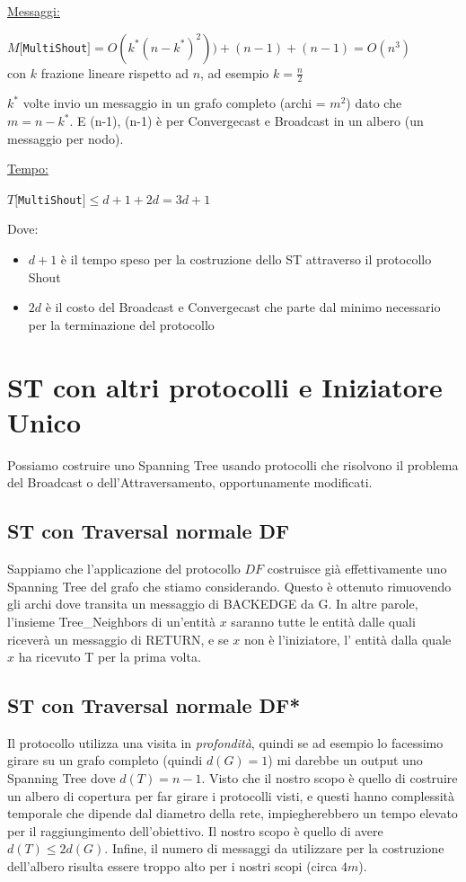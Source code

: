 \underline{Messaggi:}
\begin{center}
    $M[$\texttt{MultiShout}$] = O(k^*(n-k^*)^2)) + (n-1)+ (n-1) = O(n^3)$\\
    con $k$ frazione lineare rispetto ad $n$, ad esempio $k=\frac{n}{2}$
\end{center}
$k^*$ volte invio un messaggio in un grafo completo (archi = $m^2$) dato che
$m=n-k^*$. E (n-1), (n-1) è per Convergecast e Broadcast in un albero (un
messaggio per nodo).

\underline{Tempo:}
\begin{center}
    $T[$\texttt{MultiShout}$] \leq d + 1 + 2d = 3d + 1$
\end{center}
Dove:
\begin{itemize}
    \item  $d+1$ è il tempo speso per la costruzione dello ST attraverso il
          protocollo Shout
    \item $2d$ è il costo del Broadcast e Convergecast che parte dal minimo
          necessario per la terminazione del protocollo
\end{itemize}

\section{ST con altri protocolli e Iniziatore Unico}
Possiamo costruire uno Spanning Tree usando protocolli che risolvono il problema
del Broadcast o dell'Attraversamento, opportunamente modificati.

\subsection{ST con Traversal normale DF}
Sappiamo che l'applicazione del protocollo $DF$ costruisce già effettivamente
uno Spanning Tree del grafo che stiamo considerando. Questo è ottenuto
rimuovendo gli archi dove transita un messaggio di BACKEDGE da G. In altre
parole, l'insieme Tree\_Neighbors di un'entità $x$ saranno tutte le entità dalle
quali riceverà un messaggio di RETURN, e se $x$ non è l'iniziatore, l' entità
dalla quale $x$ ha ricevuto T per la prima volta.

\subsection{ST con Traversal normale DF*}
Il protocollo utilizza una visita in \textit{profondità}, quindi se ad esempio
lo facessimo girare su un grafo completo (quindi $d(G)=1$) mi darebbe un output
uno Spanning Tree dove $d(T) = n-1$. Visto che il nostro scopo è quello di
costruire un albero di copertura per far girare i protocolli visti, e questi
hanno complessità temporale che dipende dal diametro della rete, impiegherebbero
un tempo elevato per il raggiungimento dell'obiettivo. Il nostro scopo è quello
di avere $d(T) \leq 2d(G)$. Infine, il numero di messaggi da utilizzare per la
costruzione dell'albero risulta essere troppo alto per i nostri scopi (circa
$4m$).

